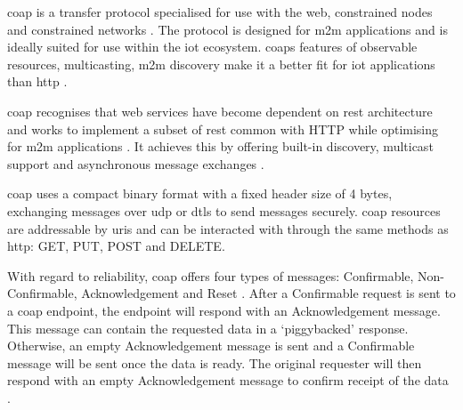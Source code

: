 \acrfull{coap} is a transfer protocol specialised for use with the web, constrained
nodes and constrained networks \citep{shelby_constrained_2014}. The protocol is 
designed for \gls{m2m} applications and is ideally suited for use within the 
\gls{iot} ecosystem. \glspl{coap} features of observable resources, multicasting, \gls{m2m} discovery 
make it a better fit for \gls{iot} applications than \gls{http} \citep{kovatsch_californium:_2014}.

\gls{coap} recognises that web services have become dependent on \gls{rest} 
architecture and works to implement a subset of \gls{rest} common with HTTP while
optimising for \gls{m2m} applications \citep{shelby_constrained_2014}. It achieves 
this by offering built-in discovery, multicast support and asynchronous message 
exchanges \citep{shelby_constrained_2014}. 

\gls{coap} uses a compact binary format with a fixed header size of 4 bytes, 
exchanging messages over \gls{udp} or \gls{dtls} to send messages securely. \gls{coap} 
resources are addressable by \glspl{uri} and can be interacted with through the 
same methods as \gls{http}: GET, PUT, POST and DELETE.

With regard to reliability, \gls{coap} offers four types of messages: Confirmable, 
Non-Confirmable, Acknowledgement and Reset \citep{bellavista_towards_2016}.
After a Confirmable request is sent to a \gls{coap} endpoint, the endpoint will 
respond with an Acknowledgement message. This message can contain the requested 
data in a `piggybacked' response. Otherwise, an empty Acknowledgement message is sent 
and a Confirmable message will be sent once the data is ready. The original
requester will then respond with an empty Acknowledgement message to confirm receipt 
of the data \citep{shelby_constrained_2014}.
